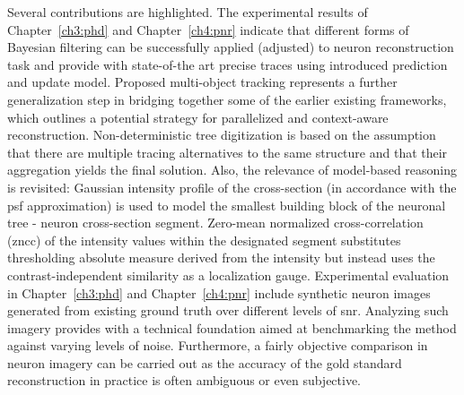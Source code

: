 Several contributions are highlighted. The experimental results of Chapter~\ref{ch3:phd} and Chapter~\ref{ch4:pnr} indicate that different forms of Bayesian filtering can be successfully applied (adjusted) to neuron reconstruction task and provide with state-of-the art precise traces using introduced prediction and update model. Proposed multi-object tracking represents a further generalization step in bridging together some of the earlier existing frameworks, which outlines a potential strategy for parallelized and context-aware reconstruction. Non-deterministic tree digitization is based on the assumption that there are multiple tracing alternatives to the same structure and that their aggregation yields the final solution. Also, the relevance of model-based reasoning is revisited: Gaussian intensity profile \cite{zhao2011automated, radojevic2017neuron} of the cross-section (in accordance with the \gls{psf} approximation) is used to model the smallest building block of the neuronal tree - neuron cross-section segment. Zero-mean normalized cross-correlation (\gls{zncc}) of the intensity values within the designated segment substitutes thresholding absolute measure derived from the intensity but instead uses the contrast-independent similarity as a localization gauge. Experimental evaluation in Chapter~\ref{ch3:phd} and Chapter~\ref{ch4:pnr} include synthetic neuron images generated from existing ground truth over different levels of \gls{snr}. Analyzing such imagery provides with a technical foundation aimed at benchmarking the method against varying levels of noise. Furthermore, a fairly objective comparison in neuron imagery can be carried out as the accuracy of the gold standard reconstruction in practice is often ambiguous or even subjective.